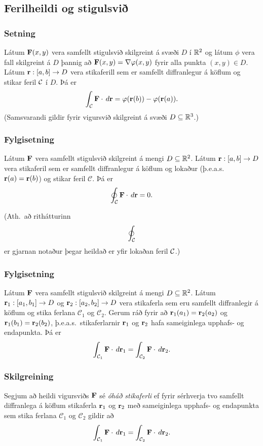 \subsection{Ferilheildi og stigulsvið} 

\subsubsection{Setning \rtask{}}
Látum $\mbox{${\bf F}$}(x,y)$ vera samfellt stigulsvið skilgreint á svæði $D$ í ${\mathbb R}^2$ og látum $\phi$ vera fall skilgreint á $D$ þannig að $\mbox{${\bf F}$}(x,y)=\nabla \varphi(x,y)$ fyrir alla punkta $(x,y)\in D$.   Látum $\mbox{${\bf r}$}:[a,b]\rightarrow D$ vera stikaferill sem er samfellt diffranlegur á köflum og stikar feril $\cal C$ í $D$.  Þá er
$$\int_{\cal C} \mbox{${\bf F}$}\cdot \,d\mbox{${\bf r}$}=\varphi(\mbox{${\bf r}$}(b))-\varphi(\mbox{${\bf r}$}(a)).$$
(Samsvarandi gildir fyrir vigursvið skilgreint á svæði $D\subseteq {\mathbb R}^3$.)






\subsubsection{Fylgisetning \rtask{}} %
Látum $\mbox{${\bf F}$}$ vera samfellt stigulsvið
skilgreint á mengi $D\subseteq {\mathbb R}^2$.   Látum $\mbox{${\bf r}$}:[a,b]\rightarrow D$ vera
stikaferil sem er samfellt diffranlegur á köflum og lokaður (þ.e.a.s. $\mbox{${\bf r}$}(a)=\mbox{${\bf r}$}(b)$) og stikar feril $\mathcal{C}$.  Þá er $$\oint_{\cal C}  \mbox{${\bf F}$}\cdot \,d\mbox{${\bf r}$}=0.$$

(Ath.~að rithátturinn $$\oint_{\cal C}$$ er gjarnan notaður þegar heildað er yfir lokaðan feril $\cal C$.)




\subsubsection{Fylgisetning \rtask{}}
Látum $\mbox{${\bf F}$}$ vera samfellt stigulsvið
skilgreint á mengi $D\subseteq {\mathbb R}^2$.   Látum
$\mbox{${\bf r}$}_1:[a_1,b_1]\rightarrow D$ og $\mbox{${\bf r}$}_2:[a_2,b_2]\rightarrow D$ vera
stikaferla sem eru samfellt diffranlegir á köflum og stika ferlana $\mathcal{C}_1$ og $\mathcal{C}_2$.  Gerum ráð fyrir
að $\mbox{${\bf r}$}_1(a_1)=\mbox{${\bf r}$}_2(a_2)$ og $\mbox{${\bf r}$}_1(b_1)=\mbox{${\bf r}$}_2(b_2)$, þ.e.a.s.\ stikaferlarnir $\mbox{${\bf r}$}_1$ og $\mbox{${\bf r}$}_2$ hafa sameiginlega upphafs- og endapunkta.   Þá er  
$$\int_{{\cal C}_1} \mbox{${\bf F}$}\cdot\,d\mbox{${\bf r}$}_1=\int_{{\cal C}_2} \mbox{${\bf F}$}\cdot\,d\mbox{${\bf r}$}_2.$$ 
 


\subsubsection{Skilgreining \rtask{}}
 Segjum að heildi vigursviðs $\mbox{${\bf F}$}$ sé {\em
  óháð stikaferli} ef fyrir sérhverja tvo samfellt diffranlega á
köflum stikaferla $\mbox{${\bf r}$}_1$ og $\mbox{${\bf r}$}_2$ með sameiginlega upphafs- og
endapunkta sem stika ferlana $\mathcal{C}_1$ og $\mathcal{C}_2$ gildir að  
$$\int_{{\cal C}_1} \mbox{${\bf F}$}\cdot\,d\mbox{${\bf r}$}_1=
\int_{{\cal C}_2} \mbox{${\bf F}$}\cdot\,d\mbox{${\bf r}$}_2.$$ 



